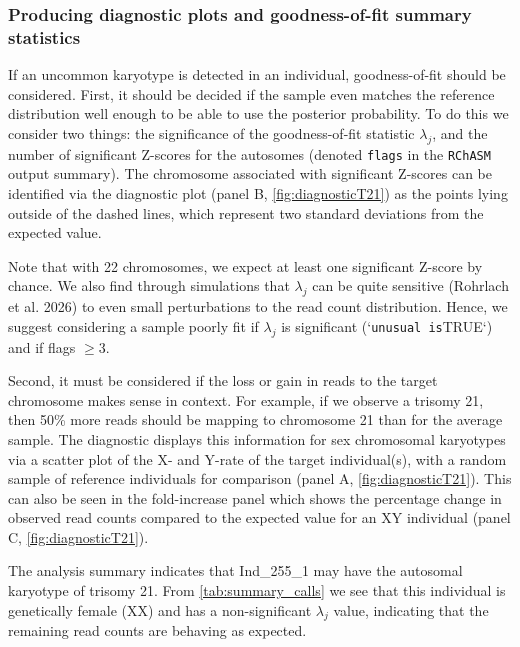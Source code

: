 \documentclass[
  letterpaper,
  DIV=11,
  numbers=noendperiod]{scrartcl}
\begin{document}
\subsubsection{Producing diagnostic plots and goodness-of-fit summary
statistics}\label{producing-diagnostic-plots-and-goodness-of-fit-summary-statistics}

If an uncommon karyotype is detected in an individual, goodness-of-fit
should be considered. First, it should be decided if the sample even
matches the reference distribution well enough to be able to use the
posterior probability. To do this we consider two things: the
significance of the goodness-of-fit statistic \(\lambda_j\), and the
number of significant Z-scores for the autosomes (denoted \texttt{flags}
in the \texttt{RChASM} output summary). The chromosome associated with
significant Z-scores can be identified via the diagnostic plot (panel B,
\autoref{fig:diagnosticT21}) as the points lying outside of the dashed
lines, which represent two standard deviations from the expected value.

Note that with 22 chromosomes, we expect at least one significant
Z-score by chance. We also find through simulations that \(\lambda_j\)
can be quite sensitive (Rohrlach et al. 2026) to even small
perturbations to the read count distribution. Hence, we suggest
considering a sample poorly fit if \(\lambda_j\) is significant
(`\texttt{unusual\textquotesingle{}\textquotesingle{}\ is}TRUE`) and if
flags \(\geq3\).

Second, it must be considered if the loss or gain in reads to the target
chromosome makes sense in context. For example, if we observe a trisomy
21, then 50\% more reads should be mapping to chromosome 21 than for the
average sample. The diagnostic displays this information for sex
chromosomal karyotypes via a scatter plot of the X- and Y-rate of the
target individual(s), with a random sample of reference individuals for
comparison (panel A, \autoref{fig:diagnosticT21}). This can also be seen
in the fold-increase panel which shows the percentage change in observed
read counts compared to the expected value for an XY individual (panel
C, \autoref{fig:diagnosticT21}).

The analysis summary indicates that Ind\_255\_1 may have the autosomal
karyotype of trisomy 21. From \autoref{tab:summary_calls} we see that
this individual is genetically female (XX) and has a non-significant
\(\lambda_j\) value, indicating that the remaining read counts are
behaving as expected.
\end{document}
